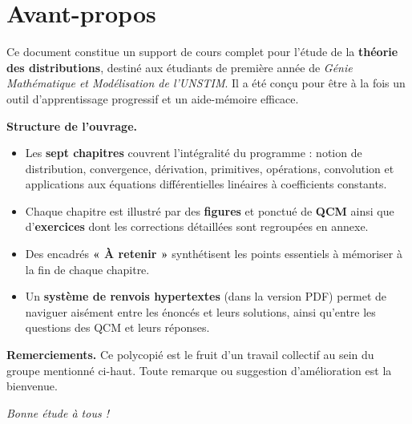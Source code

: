 \documentclass[12pt,a4paper,openany]{book}
\newcounter{exercice}[chapter]   %
\theoremstyle{definition}
\theoremstyle{plain}
\theoremstyle{remark}
\begin{document}
\cleardoublepage

	\setcounter{page}{1}
	
	\frontmatter
	\tableofcontents


	
	\listoffigures
	
	\chapter*{Avant-propos}
	
	Ce document constitue un support de cours complet pour l'étude de la \textbf{théorie des distributions}, destiné aux étudiants de première année de \textit{Génie Mathématique et Modélisation de l'UNSTIM}. Il a été conçu pour être à la fois un outil d'apprentissage progressif et un aide-mémoire efficace.
	
	\medskip
	\noindent\textbf{Structure de l'ouvrage.}
	\begin{itemize}[itemsep=2pt]
		\item Les \textbf{sept chapitres} couvrent l'intégralité du programme : notion de distribution, convergence, dérivation, primitives, opérations, convolution et applications aux équations différentielles linéaires à coefficients constants.
		\item Chaque chapitre est illustré par des \textbf{figures} et ponctué de \textbf{QCM} ainsi que d'\textbf{exercices} dont les corrections détaillées sont regroupées en annexe.
		\item Des encadrés \textbf{« À retenir »} synthétisent les points essentiels à mémoriser à la fin de chaque chapitre.
		\item Un \textbf{système de renvois hypertextes} (dans la version PDF) permet de naviguer aisément entre les énoncés et leurs solutions, ainsi qu'entre les questions des QCM et leurs réponses.
	\end{itemize}
	
	\medskip
	\noindent\textbf{Remerciements.} Ce polycopié est le fruit d'un travail collectif au sein du groupe mentionné ci-haut. Toute remarque ou suggestion d'amélioration est la bienvenue.
	
	\vspace{1.5cm}
	\begin{flushright}
		\textit{Bonne étude à tous !}
	\end{flushright}
	
\end{document}
